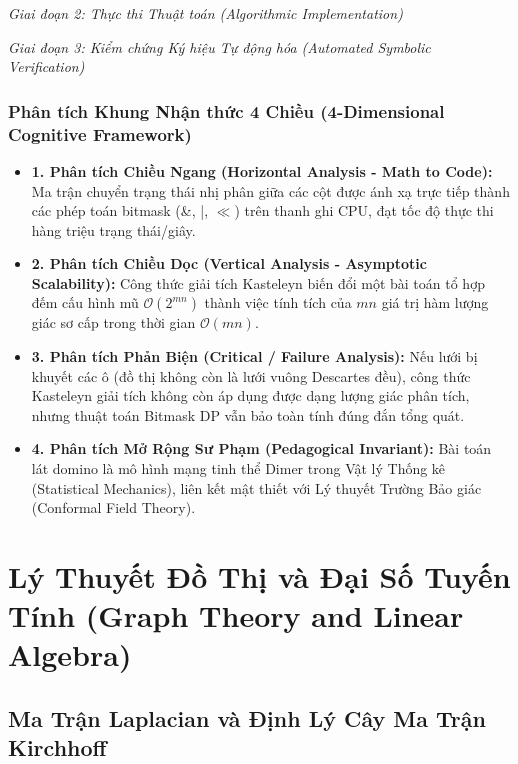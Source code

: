 \documentclass{article}
\begin{document}
\vspace{0.5em}\noindent\emph{Giai đoạn 2: Thực thi Thuật toán (Algorithmic Implementation)}


\vspace{0.5em}\noindent\emph{Giai đoạn 3: Kiểm chứng Ký hiệu Tự động hóa (Automated Symbolic Verification)}


\subsubsection*{Phân tích Khung Nhận thức 4 Chiều (4-Dimensional Cognitive Framework)}
\begin{itemize}
    \item \textbf{1. Phân tích Chiều Ngang (Horizontal Analysis - Math to Code):} Ma trận chuyển trạng thái nhị phân giữa các cột được ánh xạ trực tiếp thành các phép toán bitmask (\&, |, $\ll$) trên thanh ghi CPU, đạt tốc độ thực thi hàng triệu trạng thái/giây.
    \item \textbf{2. Phân tích Chiều Dọc (Vertical Analysis - Asymptotic Scalability):} Công thức giải tích Kasteleyn biến đổi một bài toán tổ hợp đếm cấu hình mũ $\mathcal{O}(2^{mn})$ thành việc tính tích của $mn$ giá trị hàm lượng giác sơ cấp trong thời gian $\mathcal{O}(mn)$.
    \item \textbf{3. Phân tích Phản Biện (Critical / Failure Analysis):} Nếu lưới bị khuyết các ô (đồ thị không còn là lưới vuông Descartes đều), công thức Kasteleyn giải tích không còn áp dụng được dạng lượng giác phân tích, nhưng thuật toán Bitmask DP vẫn bảo toàn tính đúng đắn tổng quát.
    \item \textbf{4. Phân tích Mở Rộng Sư Phạm (Pedagogical Invariant):} Bài toán lát domino là mô hình mạng tinh thể Dimer trong Vật lý Thống kê (Statistical Mechanics), liên kết mật thiết với Lý thuyết Trường Bảo giác (Conformal Field Theory).
\end{itemize}


\section{Lý Thuyết Đồ Thị và Đại Số Tuyến Tính (Graph Theory and Linear Algebra)}
\subsection{Ma Trận Laplacian và Định Lý Cây Ma Trận Kirchhoff}
\end{document}
